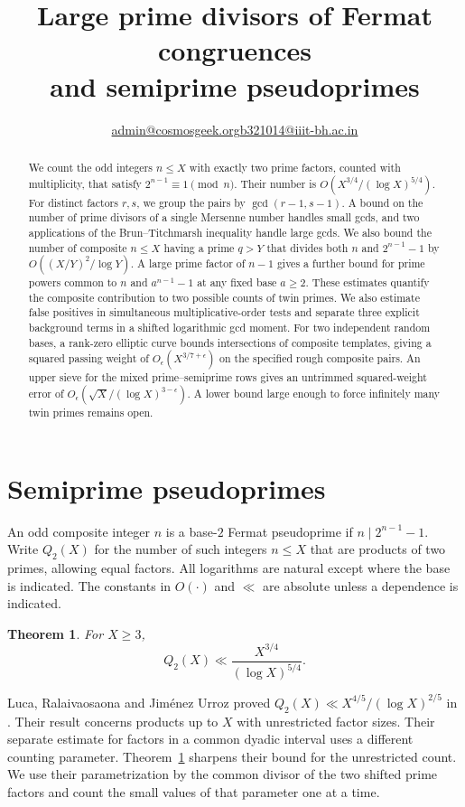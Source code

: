 \documentclass[11pt]{article}
\title{Large prime divisors of Fermat congruences\\and semiprime pseudoprimes}
\author{\small \href{mailto:admin@cosmosgeek.org}{admin@cosmosgeek.org}\qquad \href{mailto:b321014@iiit-bh.ac.in}{b321014@iiit-bh.ac.in}}
\date{}
\newtheorem{theorem}{Theorem}[section]
\begin{document}
\maketitle
\begin{abstract}
We count the odd integers \(n\le X\) with exactly two prime factors,
counted with multiplicity, that satisfy \(2^{n-1}\equiv1\pmod n\).
Their number is \(O(X^{3/4}/(\log X)^{5/4})\). For distinct
factors \(r,s\), we group the pairs by \(\gcd(r-1,s-1)\).
A bound on the number of prime divisors of a single Mersenne number
handles small gcds, and two applications of the Brun--Titchmarsh
inequality handle large gcds. We also bound the number of composite
\(n\le X\) having a prime \(q>Y\) that divides both \(n\) and
\(2^{n-1}-1\) by \(O((X/Y)^2/\log Y)\). A large prime factor
of \(n-1\) gives a further bound for prime powers common to
\(n\) and \(a^{n-1}-1\) at any fixed base \(a\ge2\). These estimates quantify
the composite contribution to two possible counts of twin primes.
We also estimate false positives in simultaneous multiplicative-order tests and separate three explicit background terms in a shifted logarithmic gcd moment. For two independent random bases, a rank-zero elliptic curve bounds intersections of composite templates, giving a squared passing weight of $O_\epsilon(X^{3/7+\epsilon})$ on the specified rough composite pairs. An upper sieve for the mixed prime--semiprime rows gives an untrimmed squared-weight error of $O_\epsilon(\sqrt X/(\log X)^{3-\epsilon})$. A lower bound large enough to force infinitely many twin primes remains open.
\end{abstract}

\section{Semiprime pseudoprimes}

An odd composite integer \(n\) is a base-\(2\) Fermat pseudoprime if
\(n\mid 2^{n-1}-1\). Write \(Q_2(X)\) for the number of such integers
\(n\le X\) that are products of two primes, allowing equal factors.
All logarithms are natural except where the base is indicated. The
constants in \(O(\cdot)\) and \(\ll\) are absolute unless a
dependence is indicated.

\begin{theorem}\label{thm:semiprime}
For \(X\ge3\),
\[
             Q_2(X)\ll \frac{X^{3/4}}{(\log X)^{5/4}}.
\]
\end{theorem}

Luca, Ralaivaosaona and Jim\'enez Urroz proved
\(Q_2(X)\ll X^{4/5}/(\log X)^{2/5}\) in
\cite[Theorem~3.1]{LRJ}. Their result concerns products up to \(X\)
with unrestricted factor sizes. Their separate estimate for factors
in a common dyadic interval uses a different counting parameter.
Theorem~\ref{thm:semiprime} sharpens their bound for the unrestricted
count. We use their parametrization by the common divisor of the two
shifted prime factors and count the small values of that parameter
one at a time.
\end{document}
